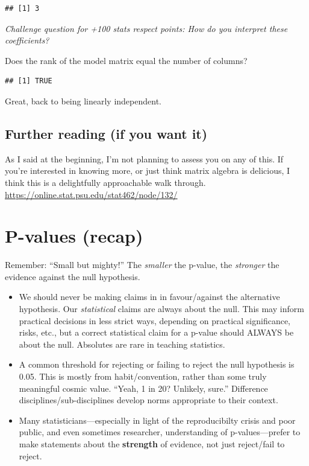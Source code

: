 \documentclass[
  openany]{book}
\providecommand{\tightlist}{%
  \setlength{\itemsep}{0pt}\setlength{\parskip}{0pt}}
\begin{document}
\begin{verbatim}
## [1] 3
\end{verbatim}

\emph{Challenge question for +100 stats respect points: How do you interpret these coefficients?}

Does the rank of the model matrix equal the number of columns?

\begin{verbatim}
## [1] TRUE
\end{verbatim}

Great, back to being linearly independent.

\hypertarget{further-reading-if-you-want-it}{%
\subsection{Further reading (if you want it)}\label{further-reading-if-you-want-it}}

As I said at the beginning, I'm not planning to assess you on any of this. If you're interested in knowing more, or just think matrix algebra is delicious, I think this is a delightfully approachable walk through. \url{https://online.stat.psu.edu/stat462/node/132/}

\hypertarget{p-values-recap}{%
\section{P-values (recap)}\label{p-values-recap}}

Remember: ``Small but mighty!'' The \emph{smaller} the p-value, the \emph{stronger} the evidence against the null hypothesis.

\begin{itemize}
\tightlist
\item
  We should never be making claims in in favour/against the alternative hypothesis. Our \emph{statistical} claims are always about the null. This may inform practical decisions in less strict ways, depending on practical significance, risks, etc., but a correct statistical claim for a p-value should ALWAYS be about the null. Absolutes are rare in teaching statistics.\\
\item
  A common threshold for rejecting or failing to reject the null hypothesis is 0.05. This is mostly from habit/convention, rather than some truly meaningful cosmic value. ``Yeah, 1 in 20? Unlikely, sure.'' Difference disciplines/sub-disciplines develop norms appropriate to their context.
\item
  Many statisticians---especially in light of the reproducibilty crisis and poor public, and even sometimes researcher, understanding of p-values---prefer to make statements about the \textbf{strength} of evidence, not just reject/fail to reject.
\end{itemize}
\end{document}
